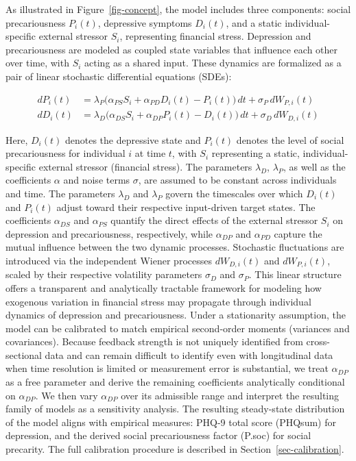 \documentclass[
]{article}
\begin{document}
As illustrated in Figure~\ref{fig-concept}, the model includes three
components: social precariousness \(P_i(t)\), depressive symptoms
\(D_i(t)\), and a static individual-specific external stressor \(S_i\),
representing financial stress. Depression and precariousness are modeled
as coupled state variables that influence each other over time, with
\(S_i\) acting as a shared input. These dynamics are formalized as a
pair of linear stochastic differential equations (SDEs):

\[
\begin{aligned}
dP_i(t) &= \lambda_P \big( \alpha_{PS} S_i + \alpha_{PD} D_i(t) - P_i(t) \big) \, dt + \sigma_P \, dW_{P,i}(t) \\
dD_i(t) &= \lambda_D \big( \alpha_{DS} S_i + \alpha_{DP} P_i(t) - D_i(t) \big) \, dt + \sigma_D \, dW_{D,i}(t)
\end{aligned}
\]

Here, \(D_i(t)\) denotes the depressive state and \(P_i(t)\) denotes the
level of social precariousness for individual \(i\) at time \(t\), with
\(S_i\) representing a static, individual-specific external stressor
(financial stress). The parameters \(\lambda_D\), \(\lambda_P\), as well
as the coefficients \(\alpha\) and noise terms \(\sigma\), are assumed
to be constant across individuals and time. The parameters \(\lambda_D\)
and \(\lambda_P\) govern the timescales over which \(D_i(t)\) and
\(P_i(t)\) adjust toward their respective input-driven target states.
The coefficients \(\alpha_{DS}\) and \(\alpha_{PS}\) quantify the direct
effects of the external stressor \(S_i\) on depression and
precariousness, respectively, while \(\alpha_{DP}\) and \(\alpha_{PD}\)
capture the mutual influence between the two dynamic processes.
Stochastic fluctuations are introduced via the independent Wiener
processes \(dW_{D,i}(t)\) and \(dW_{P,i}(t)\), scaled by their
respective volatility parameters \(\sigma_D\) and \(\sigma_P\). This
linear structure offers a transparent and analytically tractable
framework for modeling how exogenous variation in financial stress may
propagate through individual dynamics of depression and precariousness.
\textcolor{BrickRed}{Under a stationarity assumption, the model can be calibrated to match empirical second-order moments (variances and covariances). Because feedback strength is not uniquely identified from cross-sectional data and can remain difficult to identify even with longitudinal data when time resolution is limited or measurement error is substantial, we treat $\alpha_{DP}$ as a free parameter and derive the remaining coefficients analytically conditional on $\alpha_{DP}$. We then vary $\alpha_{DP}$ over its admissible range and interpret the resulting family of models as a sensitivity analysis.}
The resulting steady-state distribution of the model aligns with
empirical measures: PHQ-9 total score (PHQsum) for depression, and the
derived social precariousness factor (P.soc) for social precarity. The
full calibration procedure is described in
Section~\ref{sec-calibration}.
\end{document}

